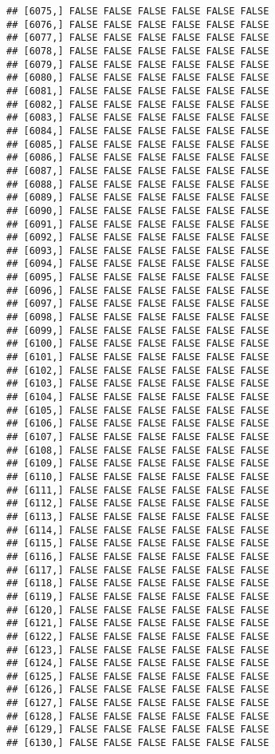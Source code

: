 \documentclass[
]{article}
\begin{document}
\begin{verbatim}
## [6075,] FALSE FALSE FALSE FALSE FALSE FALSE
## [6076,] FALSE FALSE FALSE FALSE FALSE FALSE
## [6077,] FALSE FALSE FALSE FALSE FALSE FALSE
## [6078,] FALSE FALSE FALSE FALSE FALSE FALSE
## [6079,] FALSE FALSE FALSE FALSE FALSE FALSE
## [6080,] FALSE FALSE FALSE FALSE FALSE FALSE
## [6081,] FALSE FALSE FALSE FALSE FALSE FALSE
## [6082,] FALSE FALSE FALSE FALSE FALSE FALSE
## [6083,] FALSE FALSE FALSE FALSE FALSE FALSE
## [6084,] FALSE FALSE FALSE FALSE FALSE FALSE
## [6085,] FALSE FALSE FALSE FALSE FALSE FALSE
## [6086,] FALSE FALSE FALSE FALSE FALSE FALSE
## [6087,] FALSE FALSE FALSE FALSE FALSE FALSE
## [6088,] FALSE FALSE FALSE FALSE FALSE FALSE
## [6089,] FALSE FALSE FALSE FALSE FALSE FALSE
## [6090,] FALSE FALSE FALSE FALSE FALSE FALSE
## [6091,] FALSE FALSE FALSE FALSE FALSE FALSE
## [6092,] FALSE FALSE FALSE FALSE FALSE FALSE
## [6093,] FALSE FALSE FALSE FALSE FALSE FALSE
## [6094,] FALSE FALSE FALSE FALSE FALSE FALSE
## [6095,] FALSE FALSE FALSE FALSE FALSE FALSE
## [6096,] FALSE FALSE FALSE FALSE FALSE FALSE
## [6097,] FALSE FALSE FALSE FALSE FALSE FALSE
## [6098,] FALSE FALSE FALSE FALSE FALSE FALSE
## [6099,] FALSE FALSE FALSE FALSE FALSE FALSE
## [6100,] FALSE FALSE FALSE FALSE FALSE FALSE
## [6101,] FALSE FALSE FALSE FALSE FALSE FALSE
## [6102,] FALSE FALSE FALSE FALSE FALSE FALSE
## [6103,] FALSE FALSE FALSE FALSE FALSE FALSE
## [6104,] FALSE FALSE FALSE FALSE FALSE FALSE
## [6105,] FALSE FALSE FALSE FALSE FALSE FALSE
## [6106,] FALSE FALSE FALSE FALSE FALSE FALSE
## [6107,] FALSE FALSE FALSE FALSE FALSE FALSE
## [6108,] FALSE FALSE FALSE FALSE FALSE FALSE
## [6109,] FALSE FALSE FALSE FALSE FALSE FALSE
## [6110,] FALSE FALSE FALSE FALSE FALSE FALSE
## [6111,] FALSE FALSE FALSE FALSE FALSE FALSE
## [6112,] FALSE FALSE FALSE FALSE FALSE FALSE
## [6113,] FALSE FALSE FALSE FALSE FALSE FALSE
## [6114,] FALSE FALSE FALSE FALSE FALSE FALSE
## [6115,] FALSE FALSE FALSE FALSE FALSE FALSE
## [6116,] FALSE FALSE FALSE FALSE FALSE FALSE
## [6117,] FALSE FALSE FALSE FALSE FALSE FALSE
## [6118,] FALSE FALSE FALSE FALSE FALSE FALSE
## [6119,] FALSE FALSE FALSE FALSE FALSE FALSE
## [6120,] FALSE FALSE FALSE FALSE FALSE FALSE
## [6121,] FALSE FALSE FALSE FALSE FALSE FALSE
## [6122,] FALSE FALSE FALSE FALSE FALSE FALSE
## [6123,] FALSE FALSE FALSE FALSE FALSE FALSE
## [6124,] FALSE FALSE FALSE FALSE FALSE FALSE
## [6125,] FALSE FALSE FALSE FALSE FALSE FALSE
## [6126,] FALSE FALSE FALSE FALSE FALSE FALSE
## [6127,] FALSE FALSE FALSE FALSE FALSE FALSE
## [6128,] FALSE FALSE FALSE FALSE FALSE FALSE
## [6129,] FALSE FALSE FALSE FALSE FALSE FALSE
## [6130,] FALSE FALSE FALSE FALSE FALSE FALSE

\end{verbatim}
\end{document}
